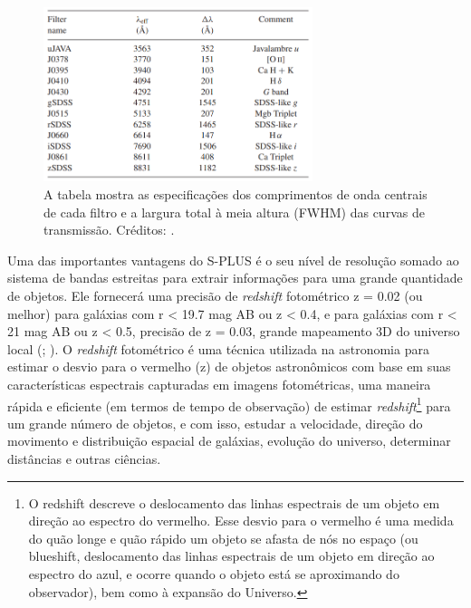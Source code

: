 \begin{figure}[h]
  \centering 
  \includegraphics[width=0.7\textwidth]{Imagens/filtros.PNG} 
  \caption[Sumário dos filtros do S-PLUS.]{A tabela mostra as especificações dos comprimentos de onda centrais de cada filtro e a largura total à meia altura (FWHM\footnotemark) das curvas de transmissão. Créditos: .}
  \label{fig:filtros} 
\end{figure}

Uma das importantes vantagens do S-PLUS é o seu nível de resolução somado ao sistema de bandas estreitas para extrair informações para uma grande quantidade de objetos. Ele fornecerá uma precisão de \emph{redshift} fotométrico z = 0.02 (ou melhor) para galáxias com r < 19.7 mag AB ou z < 0.4, e para galáxias com r < 21 mag AB ou z < 0.5, precisão de z = 0.03, grande mapeamento 3D do universo local (; ). O \emph{redshift} fotométrico é uma técnica utilizada na astronomia para estimar o desvio para o vermelho (z) de objetos astronômicos com base em suas características espectrais capturadas em imagens fotométricas, uma maneira rápida e eficiente (em termos de tempo de observação) de estimar \emph{redshift}\footnote{O redshift descreve o deslocamento das linhas espectrais de um objeto em direção ao espectro do vermelho. Esse desvio para o vermelho é uma medida do quão longe e quão rápido um objeto se afasta de nós no espaço (ou blueshift, deslocamento das linhas espectrais de um objeto em direção ao espectro do azul, e ocorre quando o objeto está se aproximando do observador), bem como à expansão do Universo.} para um grande número de objetos, e com isso, estudar a velocidade, direção do movimento e distribuição espacial de galáxias, evolução do universo, determinar distâncias e outras ciências.

